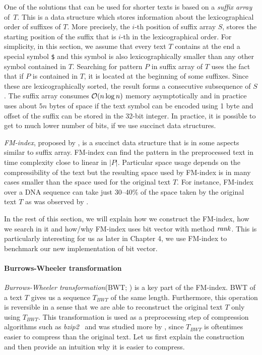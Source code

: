 One of the solutions that can be used for shorter texts is based on a \textit{suffix array} of~$T$.
This is a data structure which stores information about the lexicographical order of suffixes of $T$.
More precisely, the $i$-th position of suffix array $S$, stores the starting position of the suffix
that is $i$-th in the lexicographical order. For simplicity, in this section, we assume that every
text $T$ contains at the end a special symbol {\tt \$} and this symbol is also lexicographically
smaller than any other symbol contained in $T$. Searching for pattern $P$ in suffix array of $T$ uses
the fact that if $P$ is contained in $T$, it is located at the beginning of some suffixes. Since these
are lexicographically sorted, the result forms a consecutive subsequence of $S$. The suffix array consumes
$\mathcal{O}(n\log n)$ memory asymptotically and in practice uses about $5n$ bytes of space if the text symbol
can be encoded using 1 byte and offset of the suffix can be stored in the 32-bit integer. In practice, it
is possible to get to much lower number of bits, if we use succinct data structures.

\textit{FM-index}, proposed by \cite{ferragina2000opportunistic}, is a succinct data structure that
is in some aspects similar to suffix array. FM-index can find the pattern in the preprocessed text
in time complexity close to linear in $|P|$. Particular space usage depends on the compressibility
of the text but the resulting space used by FM-index is in many cases smaller than the space used for
the original text $T$. For instance, FM-index over a DNA sequence can take just 30--40\% of the space
taken by the original text $T$ as was observed by \cite{ferragina2001experimental}. 

In the rest of this section, we will explain how we construct the FM-index, how we search in it
and how/why FM-index uses bit vector with method $\mathit{rank}$. This is particularly interesting for us
as later in Chapter 4, we use FM-index to benchmark our new implementation of bit vector.

\paragraph{Burrows-Wheeler transformation}

\textit{Burrows-Wheeler transformation}(BWT; \cite{burrows1994block}) is a key
part of the FM-index. BWT of a text $T$ gives us a sequence $\mathit{T_{BWT}}$ of the same
length. Furthermore, this operation is reversible in a sense that we are able to reconstruct
the original text $T$ only using $\mathit{T_{BWT}}$. This transformation is used as a
preprocessing step of compression algorithms such as \textit{bzip2}~\citep{seward1996bzip2}
and was studied more by \cite{manzini2001analysis}, since $T_{BWT}$ is oftentimes easier
to compress than the original text. Let us first explain the construction and then provide
an intuition why it is easier to compress.

